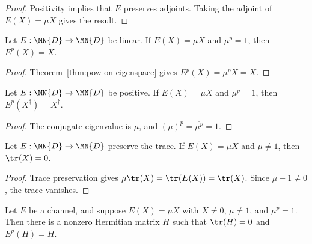 \begin{proof}\leanok
    Positivity implies that $E$ preserves adjoints. Taking the adjoint of
    $E(X)=\mu X$ gives the result.
\end{proof}

\begin{theorem}
    \label{thm:root-eigenvector-power-fixed}
    \leanok
    Let $E:\MN{D}\to\MN{D}$ be linear. If $E(X)=\mu X$ and $\mu^p=1$, then
    $E^p(X)=X$.
\end{theorem}

\begin{proof}\leanok
    Theorem~\ref{thm:pow-on-eigenspace} gives $E^p(X)=\mu^pX=X$.
\end{proof}

\begin{theorem}
    \label{thm:positive-map-conj-power-fixed}
    \leanok
    Let $E:\MN{D}\to\MN{D}$ be positive. If $E(X)=\mu X$ and $\mu^p=1$,
    then $E^p(X^\dagger)=X^\dagger$.
\end{theorem}

\begin{proof}\leanok
    The conjugate eigenvalue is $\overline\mu$, and
    $(\overline\mu)^p=\overline{\mu^p}=1$.
\end{proof}

\begin{theorem}
    \label{thm:trace-preserving-eigenvector-trace-zero}
    \leanok
    Let $E:\MN{D}\to\MN{D}$ preserve the trace. If $E(X)=\mu X$ and
    $\mu\neq1$, then $\tr(X)=0$.
\end{theorem}

\begin{proof}\leanok
    Trace preservation gives $\mu\tr(X)=\tr(E(X))=\tr(X)$. Since
    $\mu-1\neq0$, the trace vanishes.
\end{proof}

\begin{theorem}
    \label{thm:kraus-hermitian-power-fixed-point}
    \leanok
    Let $E$ be a channel, and suppose $E(X)=\mu X$ with $X\neq0$,
    $\mu\neq1$, and $\mu^p=1$. Then there is a nonzero Hermitian matrix $H$
    such that $\tr(H)=0$ and $E^p(H)=H$.
\end{theorem}


